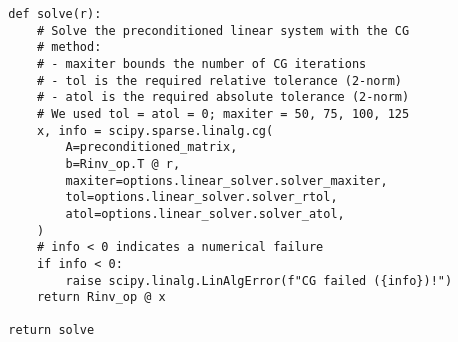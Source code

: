 \begin{verbatim}
        def solve(r):
            # Solve the preconditioned linear system with the CG
            # method:
            # - maxiter bounds the number of CG iterations
            # - tol is the required relative tolerance (2-norm)
            # - atol is the required absolute tolerance (2-norm)
            # We used tol = atol = 0; maxiter = 50, 75, 100, 125
            x, info = scipy.sparse.linalg.cg(
                A=preconditioned_matrix,
                b=Rinv_op.T @ r,
                maxiter=options.linear_solver.solver_maxiter,
                tol=options.linear_solver.solver_rtol,
                atol=options.linear_solver.solver_atol,
            )
            # info < 0 indicates a numerical failure
            if info < 0:
                raise scipy.linalg.LinAlgError(f"CG failed ({info})!")
            return Rinv_op @ x

        return solve
\end{verbatim}